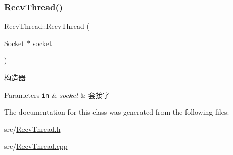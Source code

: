 \subsubsection{\texorpdfstring{Recv\+Thread()}{RecvThread()}}
{\footnotesize\ttfamily Recv\+Thread\+::\+Recv\+Thread (\begin{DoxyParamCaption}\item[{\hyperlink{class_socket}{Socket} $\ast$}]{socket }\end{DoxyParamCaption})}



构造器 


\begin{DoxyParams}[1]{Parameters}
\mbox{\tt in}  & {\em socket} & 套接字 \\
\hline
\end{DoxyParams}


The documentation for this class was generated from the following files\+:\begin{DoxyCompactItemize}
\item 
src/\hyperlink{_recv_thread_8h}{Recv\+Thread.\+h}\item 
src/\hyperlink{_recv_thread_8cpp}{Recv\+Thread.\+cpp}\end{DoxyCompactItemize}
